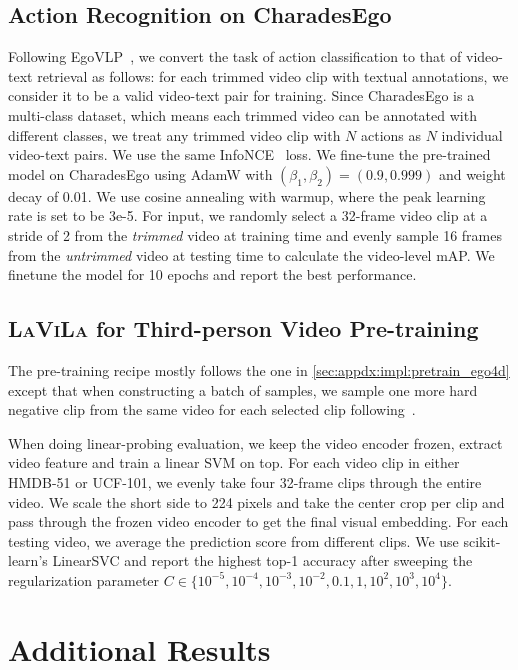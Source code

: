 \documentclass[10pt,twocolumn,letterpaper]{article}
\newcommand{\ours}{\textsc{LaViLa}\xspace}
\begin{document}
\subsection{Action Recognition on CharadesEgo}
Following EgoVLP~\cite{lin2022egovlp}, we convert the task of action classification to that of video-text retrieval as follows:
for each trimmed video clip with textual annotations, we consider it to be a valid video-text pair for training.
Since CharadesEgo is a multi-class dataset, which means each trimmed video can be annotated with different classes, we treat any trimmed video clip with $N$ actions as $N$ individual video-text pairs.
We use the same InfoNCE~\cite{oord2018cpc} loss.
We fine-tune the pre-trained model on CharadesEgo using AdamW with $(\beta_1,\beta_2)=(0.9, 0.999)$ and weight decay of 0.01.
We use cosine annealing with warmup, where the peak learning rate is set to be 3e-5.
For input, we randomly select a 32-frame video clip at a stride of 2 from the
\emph{trimmed} video at training time and evenly sample 16 frames from the \emph{untrimmed} video at testing time to calculate the video-level mAP.
We finetune the model for 10 epochs and report the best performance.

\subsection{\ours for Third-person Video Pre-training}
The pre-training recipe mostly follows the one in \cref{sec:appdx:impl:pretrain_ego4d} except that when constructing a batch of samples, we sample one more hard negative clip from the same video  for each selected clip following~\cite{han2022tan}.

When doing linear-probing evaluation, we keep the video encoder frozen, extract video feature and train a linear SVM on top.
For each video clip in either HMDB-51 or UCF-101, we evenly take four 32-frame clips through the entire video.
We scale the short side to 224 pixels and take the center crop per clip and pass through the frozen video encoder to get the final visual embedding.
For each testing video, we average the prediction score from different clips.
We use scikit-learn's LinearSVC and report the highest top-1 accuracy after sweeping the regularization parameter $C\in\{10^{-5}, 10^{-4}, 10^{-3}, 10^{-2}, 0.1, 1, 10^2, 10^3, 10^4\}$.

\section{Additional Results}\label{sec:appdx:results}
\end{document}

